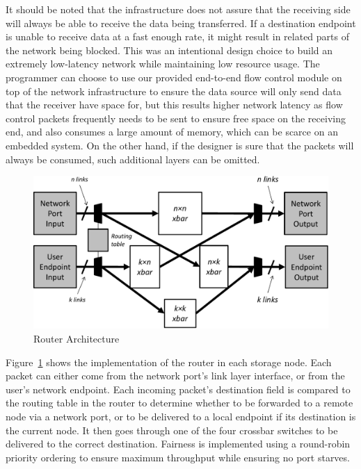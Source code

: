 It should be noted that the infrastructure does not assure that the receiving
side will always be able to receive the data being transferred. If a destination
endpoint is unable to receive data at a fast enough rate, it might result in
related parts of the network being blocked. This was an intentional design
choice to build an extremely low-latency network while maintaining low resource
usage. The programmer can choose to use our provided end-to-end flow control
module on top of the network infrastructure to ensure the data source will only
send data that the receiver have space for, but this results higher network
latency as flow control packets frequently needs to be sent to ensure free space
on the receiving end, and also consumes a large amount of memory, which can be
scarce on an embedded system.  On the other hand, if the designer is sure that
the packets will always be consumed, such additional layers can be omitted. 

\begin{figure}[h]
	\begin{center}
	\includegraphics[scale=0.4]{figures/network-routing-crop.pdf}
	\caption{Router Architecture}
	\label{fig:networkinterface}
	\end{center}
\end{figure}

Figure~\ref{fig:networkinterface} shows the implementation of the router in each
storage node. Each packet can either come from the network port's link layer
interface, or from the user's network endpoint. Each incoming packet's
destination field is compared to the routing table in the router to determine
whether to be forwarded to a remote node via a network port, or to be delivered
to a local endpoint if its destination is the current node. It then goes through
one of the four crossbar switches to be delivered to the correct destination. 
Fairness is implemented using a round-robin priority ordering to ensure maximum
throughput while ensuring no port starves.

